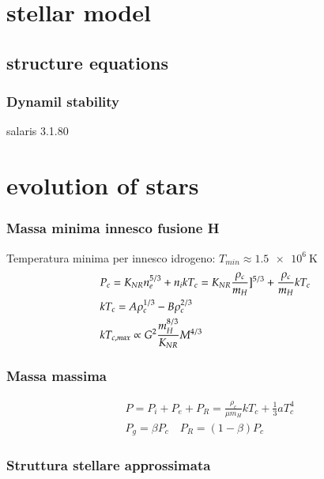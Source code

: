 \chapter{stellar model}

\section{structure equations} 

\subsection{Dynamil stability}

salaris 3.1.80

\chapter{evolution of stars}

\subsection{Massa minima innesco fusione H}

Temperatura minima per innesco idrogeno: $T_{min}\approx\SI{1.5e6}{\kelvin}$
\begin{align*}
&P_c=K_{NR}n_e^{5/3}+n_ikT_c=K_{NR}\frac{\rho_c}{m_H}]^{5/3}+\frac{\rho_c}{m_H}kT_c\\
&kT_c=A\rho_c^{1/3}-B\rho_c^{2/3}\\
&kT_{c,max}\propto G^2\frac{m_H^{8/3}}{K_{NR}}M^{4/3}
\end{align*}

\subsection{Massa massima}

\begin{align*}
&P=P_i+P_e+P_R=\frac{\rho_c}{\mu m_H}kT_c+\frac{1}{3}aT_c^4\\
&P_g=\beta P_c\quad P_R=(1-\beta)P_c
\end{align*}

\subsection{Struttura stellare approssimata}

